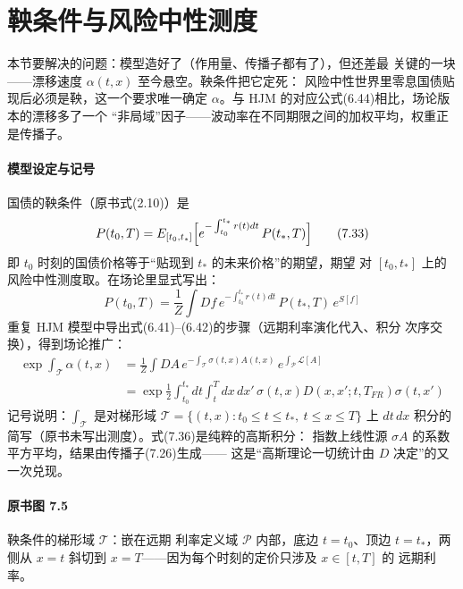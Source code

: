 \section{鞅条件与风险中性测度}

本节要解决的问题：模型造好了（作用量、传播子都有了），但还差最
关键的一块——漂移速度 $\alpha(t,x)$ 至今悬空。鞅条件把它定死：
风险中性世界里零息国债贴现后必须是鞅，这一个要求唯一确定
$\alpha$。与 HJM 的对应公式(6.44)相比，场论版本的漂移多了一个
“非局域”因子——波动率在不同期限之间的加权平均，权重正是传播子。

\paragraph{模型设定与记号}
国债的鞅条件（原书式(2.10)）是
\begin{equation*}
P(t_0,T)=E_{[t_0,t_*]}\Bigl[e^{-\int_{t_0}^{t_*}r(t)dt}\,P(t_*,T)\Bigr]
\tag{7.33}
\end{equation*}
即 $t_0$ 时刻的国债价格等于“贴现到 $t_*$ 的未来价格”的期望，期望
对 $[t_0,t_*]$ 上的风险中性测度取。在场论里显式写出：
\begin{equation*}
P(t_0,T)=\frac{1}{Z}\int Df\,e^{-\int_{t_0}^{t_*}r(t)dt}\,
P(t_*,T)\,e^{S[f]}
\tag{7.34}
\end{equation*}
重复 HJM 模型中导出式(6.41)--(6.42)的步骤（远期利率演化代入、积分
次序交换），得到场论推广：
\begin{align*}
\exp\int_{\mathcal{T}}\alpha(t,x)&=\frac{1}{Z}\int DA\,
e^{-\int_{\mathcal{T}}\sigma(t,x)A(t,x)}\,e^{\int_{\mathcal{P}}
\mathcal{L}[A]}
\tag{7.35}\\
&=\exp\frac{1}{2}\int_{t_0}^{t_*}dt\int_{t}^{T}dx\,dx'\,
\sigma(t,x)D(x,x';t,T_{FR})\sigma(t,x')
\tag{7.36}
\end{align*}
记号说明：$\int_{\mathcal{T}}$ 是对梯形域
$\mathcal{T}=\{(t,x):t_0\leq t\leq t_*,\ t\leq x\leq T\}$ 上
$dt\,dx$ 积分的简写（原书未写出测度）。式(7.36)是纯粹的高斯积分：
指数上线性源 $\sigma A$ 的系数平方平均，结果由传播子(7.26)生成——
这是“高斯理论一切统计由 $D$ 决定”的又一次兑现。

\paragraph{原书图 7.5}\quad 鞅条件的梯形域 $\mathcal{T}$：嵌在远期
利率定义域 $\mathcal{P}$ 内部，底边 $t=t_0$、顶边 $t=t_*$，两侧从
$x=t$ 斜切到 $x=T$——因为每个时刻的定价只涉及 $x\in[t,T]$ 的
远期利率。

